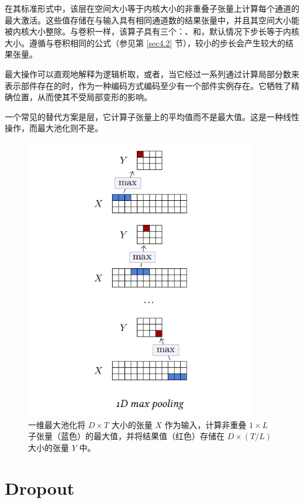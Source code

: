 在其标准形式中，该层在空间大小等于内核大小的非重叠子张量上计算每个通道的最大激活。这些值存储在与输入具有相同通道数的结果张量中，并且其空间大小能被内核大小整除。与卷积一样，该算子具有三个：、和，默认情况下步长等于内核大小。遵循与卷积相同的公式（参见第 \ref{sec4.2} 节），较小的步长会产生较大的结果张量。

最大操作可以直观地解释为逻辑析取，或者，当它经过一系列通过计算局部分数来表示部件存在的时，作为一种编码方式编码至少有一个部件实例存在。它牺牲了精确位置，从而使其不受局部变形的影响。

一个常见的替代方案是层，它计算子张量上的平均值而不是最大值。这是一种线性操作，而最大池化则不是。

\begin{figure}
    \centering
    \includegraphics[width=0.9\textwidth]{fig/fig4.6.png}
    \caption[最大池化]{一维最大池化将 $D \times T$ 大小的张量 $X$ 作为输入，计算非重叠 $1 \times L$ 子张量（蓝色）的最大值，并将结果值（红色）存储在 $D \times (T / L)$ 大小的张量 $Y$ 中。}
    \label{fig4.6}
\end{figure}

\section{Dropout}\label{sec4.5}

